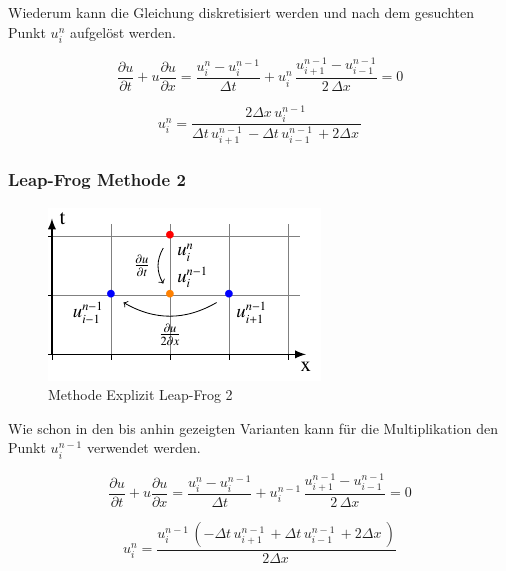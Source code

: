 	Wiederum kann die Gleichung diskretisiert werden und nach dem gesuchten Punkt $u_{i}^{n}$ aufgel\"ost werden.
	
	\begin{equation}
	\frac {\partial u}{\partial t}+u{\frac {\partial u}{\partial x}} = \frac{u_{i}^{n}-u_{i}^{n-1}}{\Delta t}+ u_{i}^{n}\, \frac{u_{i+1}^{n-1}-u_{i-1}^{n-1}}{2\,\Delta x}=0
	\end{equation}
	
	\begin{equation}
	u_{i}^{n} = \frac{2 \Delta{x}\, u^{n-1}_{i}\,}{\Delta{t}\, u^{n-1}_{i+1}\, - \Delta{t}\, u^{n-1}_{i-1}\, + 2 \Delta{x}\,}
	\end{equation}

\subsubsection{Leap-Frog Methode 2}
	
	\begin{figure}
	\centering
	\includegraphics[height=.4\textwidth]{papers/burgers/BurgersEquation/tikz/Linear3/Linear3.pdf}
	\caption{Methode Explizit Leap-Frog 2}
	\label{burgers:fig:Linear3}
	\end{figure}
	

	Wie schon in den bis anhin gezeigten Varianten kann f\"ur die Multiplikation den Punkt $u_{i}^{n-1}$ verwendet werden.

	\begin{equation}
		\frac {\partial u}{\partial t}+u{\frac {\partial u}{\partial x}} = \frac{u_{i}^{n}-u_{i}^{n-1}}{\Delta t}+ u_{i}^{n-1}\, \frac{u_{i+1}^{n-1}-u_{i-1}^{n-1}}{2\,\Delta x}=0
		\label{burgers:eq_ex_lf1}
	\end{equation}

	\begin{equation}
	 u_{i}^{n} = \frac{u^{n-1}_{i}\, \left(- \Delta{t}\, u^{n-1}_{i+1}\, + \Delta{t}\, u^{n-1}_{i-1}\, + 2 \Delta{x}\,\right)}{2 \Delta{x}\,}
		\label{burgers:eq_ex_sol_lf1}
	\end{equation}




